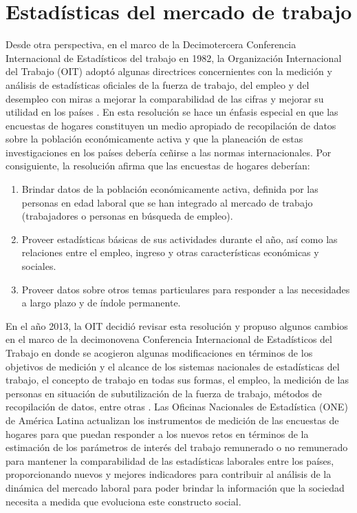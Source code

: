 \documentclass[
  12pt,
]{book}
\providecommand{\tightlist}{%
  \setlength{\itemsep}{0pt}\setlength{\parskip}{0pt}}
\begin{document}
\hypertarget{estaduxedsticas-del-mercado-de-trabajo}{%
\section{Estadísticas del mercado de trabajo}\label{estaduxedsticas-del-mercado-de-trabajo}}

Desde otra perspectiva, en el marco de la Decimotercera Conferencia Internacional de Estadísticos del trabajo en 1982, la Organización Internacional del Trabajo (OIT) adoptó algunas directrices concernientes con la medición y análisis de estadísticas oficiales de la fuerza de trabajo, del empleo y del desempleo con miras a mejorar la comparabilidad de las cifras y mejorar su utilidad en los países \citep{OIT_1982}. En esta resolución se hace un énfasis especial en que las encuestas de hogares constituyen un medio apropiado de recopilación de datos sobre la población económicamente activa y que la planeación de estas investigaciones en los países debería ceñirse a las normas internacionales. Por consiguiente, la resolución afirma que las encuestas de hogares deberían:

\begin{enumerate}
\def\labelenumi{\arabic{enumi}.}
\tightlist
\item
  Brindar datos de la población económicamente activa, definida por las personas en edad laboral que se han integrado al mercado de trabajo (trabajadores o personas en búsqueda de empleo).
\item
  Proveer estadísticas básicas de sus actividades durante el año, así como las relaciones entre el empleo, ingreso y otras características económicas y sociales.
\item
  Proveer datos sobre otros temas particulares para responder a las necesidades a largo plazo y de índole permanente.
\end{enumerate}

En el año 2013, la OIT decidió revisar esta resolución y propuso algunos cambios en el marco de la decimonovena Conferencia Internacional de Estadísticos del Trabajo en donde se acogieron algunas modificaciones en términos de los objetivos de medición y el alcance de los sistemas nacionales de estadísticas del trabajo, el concepto de trabajo en todas sus formas, el empleo, la medición de las personas en situación de subutilización de la fuerza de trabajo, métodos de recopilación de datos, entre otras \citep{OIT_2013}. Las Oficinas Nacionales de Estadística (ONE) de América Latina actualizan los instrumentos de medición de las encuestas de hogares para que puedan responder a los nuevos retos en términos de la estimación de los parámetros de interés del trabajo remunerado o no remunerado para mantener la comparabilidad de las estadísticas laborales entre los países, proporcionando nuevos y mejores indicadores para contribuir al análisis de la dinámica del mercado laboral para poder brindar la información que la sociedad necesita a medida que evoluciona este constructo social.
\end{document}
